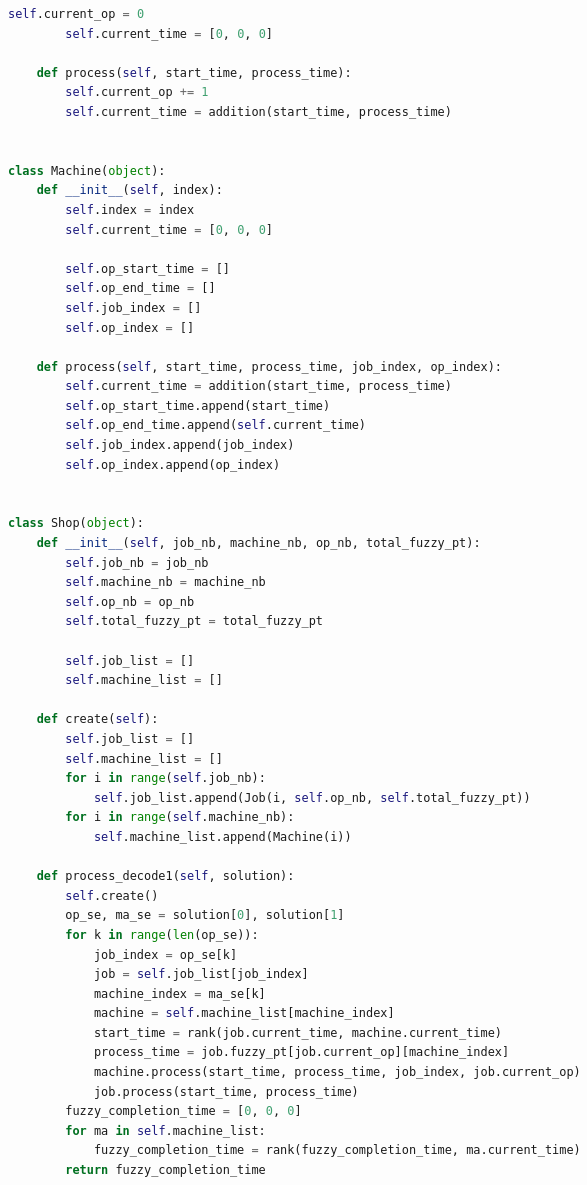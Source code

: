 \documentclass{whutmod}
\begin{document}
\begin{spacing}{1.2}
\begin{lstlisting}[language=python]
        self.current_op = 0
        self.current_time = [0, 0, 0]

    def process(self, start_time, process_time):
        self.current_op += 1
        self.current_time = addition(start_time, process_time)


class Machine(object):
    def __init__(self, index):
        self.index = index
        self.current_time = [0, 0, 0]

        self.op_start_time = []
        self.op_end_time = []
        self.job_index = []
        self.op_index = []

    def process(self, start_time, process_time, job_index, op_index):
        self.current_time = addition(start_time, process_time)
        self.op_start_time.append(start_time)
        self.op_end_time.append(self.current_time)
        self.job_index.append(job_index)
        self.op_index.append(op_index)


class Shop(object):
    def __init__(self, job_nb, machine_nb, op_nb, total_fuzzy_pt):
        self.job_nb = job_nb
        self.machine_nb = machine_nb
        self.op_nb = op_nb
        self.total_fuzzy_pt = total_fuzzy_pt

        self.job_list = []
        self.machine_list = []

    def create(self):
        self.job_list = []
        self.machine_list = []
        for i in range(self.job_nb):
            self.job_list.append(Job(i, self.op_nb, self.total_fuzzy_pt))
        for i in range(self.machine_nb):
            self.machine_list.append(Machine(i))

    def process_decode1(self, solution):
        self.create()
        op_se, ma_se = solution[0], solution[1]
        for k in range(len(op_se)):
            job_index = op_se[k]
            job = self.job_list[job_index]
            machine_index = ma_se[k]
            machine = self.machine_list[machine_index]
            start_time = rank(job.current_time, machine.current_time)
            process_time = job.fuzzy_pt[job.current_op][machine_index]
            machine.process(start_time, process_time, job_index, job.current_op)
            job.process(start_time, process_time)
        fuzzy_completion_time = [0, 0, 0]
        for ma in self.machine_list:
            fuzzy_completion_time = rank(fuzzy_completion_time, ma.current_time)
        return fuzzy_completion_time


\end{lstlisting}
\end{spacing}
\end{document}
